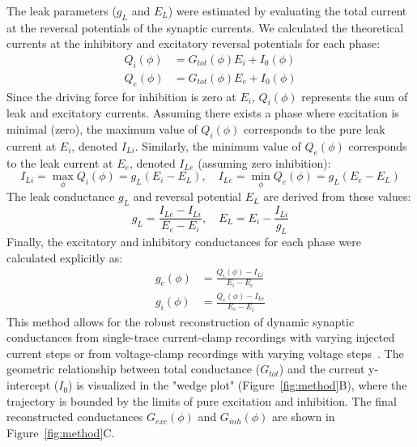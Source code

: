 \documentclass{article}
\begin{document}
The leak parameters ($g_L$ and $E_L$) were estimated by evaluating the total current at the reversal potentials of the synaptic currents. We calculated the theoretical currents at the inhibitory and excitatory reversal potentials for each phase:
\begin{align}
    Q_i(\phi) &= G_{tot}(\phi) E_i + I_0(\phi) \\
    Q_e(\phi) &= G_{tot}(\phi) E_e + I_0(\phi)
\end{align}
Since the driving force for inhibition is zero at $E_i$, $Q_i(\phi)$ represents the sum of leak and excitatory currents. Assuming there exists a phase where excitation is minimal (zero), the maximum value of $Q_i(\phi)$ corresponds to the pure leak current at $E_i$, denoted $I_{Li}$. Similarly, the minimum value of $Q_e(\phi)$ corresponds to the leak current at $E_e$, denoted $I_{Le}$ (assuming zero inhibition):
\begin{equation}
    I_{Li} = \max_\phi Q_i(\phi) = g_L(E_i - E_L), \quad I_{Le} = \min_\phi Q_e(\phi) = g_L(E_e - E_L)
\end{equation}
The leak conductance $g_L$ and reversal potential $E_L$ are derived from these values:
\begin{equation}
    g_L = \frac{I_{Le} - I_{Li}}{E_e - E_i}, \quad E_L = E_i - \frac{I_{Li}}{g_L}
\end{equation}
Finally, the excitatory and inhibitory conductances for each phase were calculated explicitly as:
\begin{align}
    g_e(\phi) &= \frac{Q_i(\phi) - I_{Li}}{E_i - E_e} \\
    g_i(\phi) &= \frac{Q_e(\phi) - I_{Le}}{E_e - E_i}
\end{align}
This method allows for the robust reconstruction of dynamic synaptic conductances from single-trace current-clamp recordings with varying injected current steps or from voltage-clamp recordings with varying voltage steps~\citep{molkov2024inference}. The geometric relationship between total conductance ($G_{tot}$) and the current y-intercept ($I_0$) is visualized in the "wedge plot" (Figure~\ref{fig:method}B), where the trajectory is bounded by the limits of pure excitation and inhibition. The final reconstructed conductances $G_{exc}(\phi)$ and $G_{inh}(\phi)$ are shown in Figure~\ref{fig:method}C.
\end{document}
